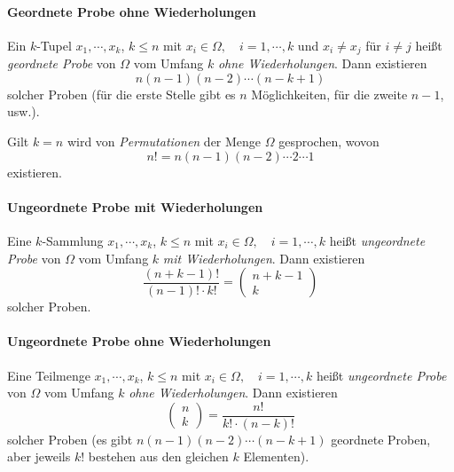 				\paragraph{Geordnete Probe ohne Wiederholungen}
					Ein \(k\)-Tupel \( x_1, \cdots, x_k \), \( k \leq n \) mit \( x_i \in \Omega, \quad i = 1, \cdots, k \) und \( x_i \neq x_j \) für \( i \neq j \) heißt \textit{geordnete Probe} von \(\Omega\) vom Umfang \(k\) \textit{ohne Wiederholungen}. Dann existieren
					\begin{equation*}
						n(n - 1)(n - 2) \cdots (n - k + 1)
					\end{equation*}
					solcher Proben (für die erste Stelle gibt es \(n\) Möglichkeiten, für die zweite \(n - 1\), usw.).

					Gilt \(k = n\) wird von \textit{Permutationen} der Menge \(\Omega\) gesprochen, wovon
					\begin{equation*}
						n! = n(n - 1)(n - 2) \cdots 2 \cdots 1
					\end{equation*}
					existieren.

				\paragraph{Ungeordnete Probe mit Wiederholungen}
					Eine \(k\)-Sammlung \( x_1, \cdots, x_k \), \( k \leq n \) mit \( x_i \in \Omega, \quad i = 1, \cdots, k \) heißt \textit{ungeordnete Probe} von \(\Omega\) vom Umfang \(k\) \textit{mit Wiederholungen}. Dann existieren
					\begin{equation*}
						\frac{(n + k - 1)!}{(n - 1)! \cdot k!} =
						\begin{pmatrix}
							n + k - 1 \\
							k
						\end{pmatrix}
					\end{equation*}
					solcher Proben.

				\paragraph{Ungeordnete Probe ohne Wiederholungen}
					Eine Teilmenge \( x_1, \cdots, x_k \), \( k \leq n \) mit \( x_i \in \Omega, \quad i = 1, \cdots, k \) heißt \textit{ungeordnete Probe} von \(\Omega\) vom Umfang \(k\) \textit{ohne Wiederholungen}. Dann existieren
					\begin{equation*}
						\begin{pmatrix}
							n \\
							k
						\end{pmatrix}
						=
						\frac{n!}{k! \cdot (n - k)!}
					\end{equation*}
					solcher Proben (es gibt \( n(n - 1)(n - 2) \cdots (n - k + 1) \) geordnete Proben, aber jeweils \(k!\) bestehen aus den gleichen \(k\) Elementen).

